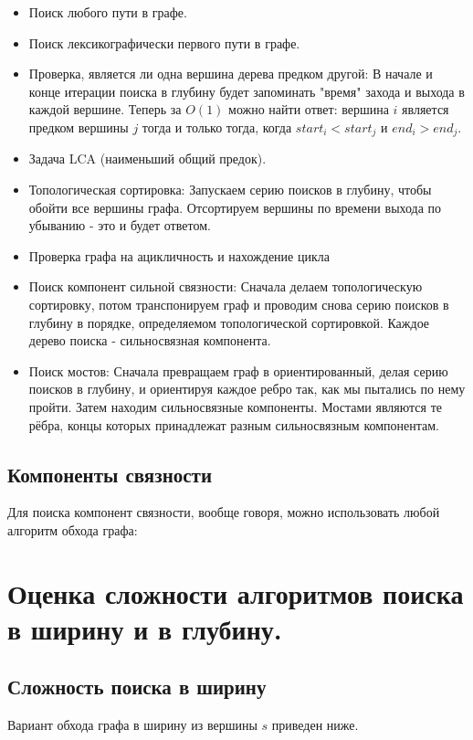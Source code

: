 \documentclass[a4paper,12pt]{article}
\begin{document}
\begin{itemize}
    \item Поиск любого пути в графе.
    \item Поиск лексикографически первого пути в графе.
    \item Проверка, является ли одна вершина дерева предком другой:
        В начале и конце итерации поиска в глубину будет запоминать "время" захода и выхода в каждой вершине. Теперь за $O(1)$ можно найти ответ: вершина $i$ является предком вершины $j$ тогда и только тогда, когда $start_i < start_j$ и $end_i > end_j$.
    \item Задача LCA (наименьший общий предок).
    \item Топологическая сортировка:
        Запускаем серию поисков в глубину, чтобы обойти все вершины графа. Отсортируем вершины по времени выхода по убыванию - это и будет ответом.
    \item Проверка графа на ацикличность и нахождение цикла
    \item Поиск компонент сильной связности:
        Сначала делаем топологическую сортировку, потом транспонируем граф и проводим снова серию поисков в глубину в порядке, определяемом топологической сортировкой. Каждое дерево поиска - сильносвязная компонента.
    \item Поиск мостов:
        Сначала превращаем граф в ориентированный, делая серию поисков в глубину, и ориентируя каждое ребро так, как мы пытались по нему пройти. Затем находим сильносвязные компоненты. Мостами являются те рёбра, концы которых принадлежат разным сильносвязным компонентам.
\end{itemize}

\subsection{Компоненты связности}

Для поиска компонент связности, вообще говоря, можно использовать любой алгоритм обхода графа:
\newpage
\section{Оценка сложности алгоритмов поиска в ширину и в глубину.}

\subsection{Сложность поиска в ширину}
Вариант обхода графа в ширину из вершины $s$ приведен ниже.
\end{document}
